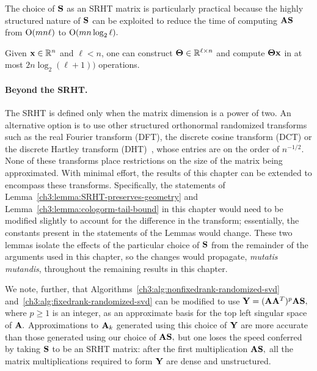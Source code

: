 The choice of $\mathbf{S}$ as an SRHT matrix is particularly practical because the highly structured nature of $\mathbf{S}$
can be exploited to reduce the time of computing $\mathbf{A} \mathbf{S}$ from
$\mathrm{O}(mn \ell)$ to $\mathrm{O}(m n\log_2 \ell).$

\begin{lemma} 
\label{ch3:prop:SRHT-compute-time}
Given ${\mathbf x} \in \mathbb{R}^n$ and $\ell < n$, one can construct $\mathbf{\Theta} \in \mathbb{R}^{\ell \times n}$ and compute $\mathbf{\Theta} {\mathbf x}$ in at most $2 n \log_2(\ell + 1) )$ operations.
\end{lemma}

\paragraph{Beyond the SRHT.}
The SRHT is defined only when the matrix dimension is a power of two.
An alternative option is to use other structured orthonormal randomized
transforms such as the
real Fourier transform (DFT), the discrete cosine transform (DCT) or the discrete Hartley transform
(DHT)~\cite{WLRT08,NDT09,RT08,AMT10}, whose entries are on the order of
$n^{-1/2}.$
None of these transforms place restrictions on the size of the matrix being approximated.
With minimal effort, the results of this chapter can be extended
to encompass these transforms. Specifically, the statements of Lemma~\ref{ch3:lemma:SRHT-preserves-geometry}
and Lemma~\ref{ch3:lemma:cologorm-tail-bound} in this chapter would need to
be modified slightly to account for the difference in the transform; essentially,
the constants present in the statements of the Lemmas would change. These two
lemmas isolate the effects of the particular choice of $\mathbf{S}$ from the 
remainder of the arguments used in this chapter, so the changes would propagate, 
\emph{mutatis mutandis}, throughout the remaining results 
in this chapter.

We note, further, that Algorithms~\ref{ch3:alg:nonfixedrank-randomized-svd} 
and~\ref{ch3:alg:fixedrank-randomized-svd} can be modified to use 
$\mathbf{Y} = (\mathbf{A} \mathbf{A}^T)^p \mathbf{A} \mathbf{S},$ where $p\geq1$ is an integer, 
as an approximate basis for the
top left singular space of $\mathbf{A}.$ Approximations to $\mathbf{A}_k$ generated 
using this choice of $\mathbf{Y}$ are more accurate than those generated using our choice of $\mathbf{A} \mathbf{S},$
but one loses the speed conferred by taking $\mathbf{S}$ to be an SRHT matrix:
after the first multiplication $\mathbf{A}\mathbf{S},$ all the matrix multiplications
required to form $\mathbf{Y}$ are dense and unstructured.


